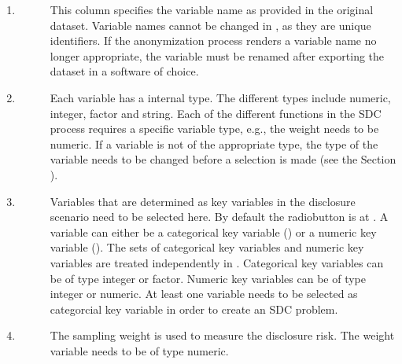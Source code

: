 \documentclass[letterpaper,10pt,english]{sphinxmanual}
\begin{document}
\begin{enumerate}
\item {} \begin{description}
\item[{}] \leavevmode
This column specifies the variable name as provided in the original dataset.
Variable names cannot be changed in , as they are unique identifiers. If
the anonymization process renders a variable name no longer appropriate, the variable
must be renamed after exporting the dataset in a software of choice.

\end{description}

\item {} \begin{description}
\item[{}] \leavevmode
Each variable has a internal  type. The different types include
numeric, integer, factor and string. Each of the different functions in the
SDC process requires a specific variable type, e.g., the weight needs to be numeric.
If a variable is not of the appropriate type, the type of the variable needs to be changed
before a selection is made (see the Section ).

\end{description}

\item {} \begin{description}
\item[{}] \leavevmode
Variables that are determined as key variables in the disclosure
scenario need to be selected here. By default the radiobutton is at . A variable
can either be a categorical key variable () or a numeric key variable ().
The sets of categorical key variables and numeric key variables are treated independently
in . Categorical key variables can be of type integer or factor. Numeric key variables
can be of type integer or numeric. At least one variable needs to be selected as
categorcial key variable in order to create an SDC problem.

\end{description}

\item {} \begin{description}
\item[{}] \leavevmode
The sampling weight is used to measure the disclosure risk. The weight
variable needs to be of type numeric.


\end{description}
\end{enumerate}
\end{document}
